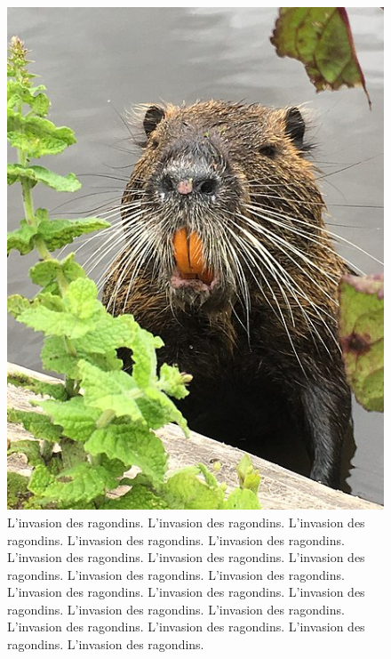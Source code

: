 \documentclass[a4paper, twoside, onecolumn, 10pt]{article}
\begin{document}
\begin{figure}[tb!]
\begin{center}
\includegraphics[width = .9\columnwidth]{images/ragondin.jpg}
\end{center}
\caption{L'invasion des ragondins. L'invasion des ragondins. L'invasion des ragondins. L'invasion des ragondins. L'invasion des ragondins. L'invasion des ragondins. L'invasion des ragondins. L'invasion des ragondins. L'invasion des ragondins. L'invasion des ragondins. L'invasion des ragondins. L'invasion des ragondins. L'invasion des ragondins. L'invasion des ragondins. L'invasion des ragondins. L'invasion des ragondins. L'invasion des ragondins. L'invasion des ragondins. L'invasion des ragondins. }
\label{fig:ragondin}
\end{figure}
\end{document}
